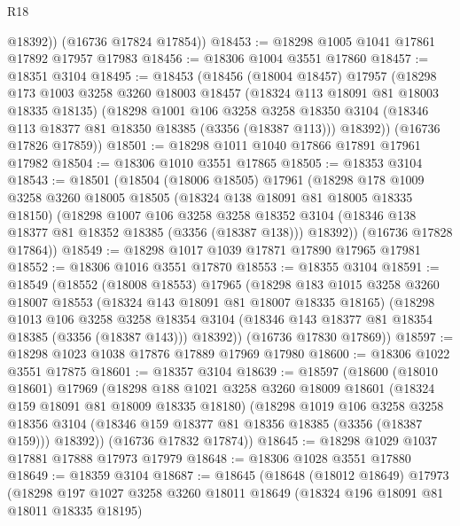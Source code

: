 \begin{lexlean}{R18}
\begin{coremodule}
          @18392))
      (@16736 @17824 @17854))
@18453 := @18298 @1005 @1041 @17861 @17892 @17957 @17983
@18456 := @18306 @1004 @3551 @17860
@18457 := @18351 @3104
@18495 := @18453
    (@18456
      (@18004 @18457)
      @17957
      (@18298
        @173
        @1003
        @3258
        @3260
        @18003
        @18457
        (@18324 @113 @18091 @81 @18003 @18335 @18135)
        (@18298
          @1001
          @106
          @3258
          @3258
          @18350
          @3104
          (@18346 @113 @18377 @81 @18350 @18385 (@3356 (@18387 @113)))
          @18392))
      (@16736 @17826 @17859))
@18501 := @18298 @1011 @1040 @17866 @17891 @17961 @17982
@18504 := @18306 @1010 @3551 @17865
@18505 := @18353 @3104
@18543 := @18501
    (@18504
      (@18006 @18505)
      @17961
      (@18298
        @178
        @1009
        @3258
        @3260
        @18005
        @18505
        (@18324 @138 @18091 @81 @18005 @18335 @18150)
        (@18298
          @1007
          @106
          @3258
          @3258
          @18352
          @3104
          (@18346 @138 @18377 @81 @18352 @18385 (@3356 (@18387 @138)))
          @18392))
      (@16736 @17828 @17864))
@18549 := @18298 @1017 @1039 @17871 @17890 @17965 @17981
@18552 := @18306 @1016 @3551 @17870
@18553 := @18355 @3104
@18591 := @18549
    (@18552
      (@18008 @18553)
      @17965
      (@18298
        @183
        @1015
        @3258
        @3260
        @18007
        @18553
        (@18324 @143 @18091 @81 @18007 @18335 @18165)
        (@18298
          @1013
          @106
          @3258
          @3258
          @18354
          @3104
          (@18346 @143 @18377 @81 @18354 @18385 (@3356 (@18387 @143)))
          @18392))
      (@16736 @17830 @17869))
@18597 := @18298 @1023 @1038 @17876 @17889 @17969 @17980
@18600 := @18306 @1022 @3551 @17875
@18601 := @18357 @3104
@18639 := @18597
    (@18600
      (@18010 @18601)
      @17969
      (@18298
        @188
        @1021
        @3258
        @3260
        @18009
        @18601
        (@18324 @159 @18091 @81 @18009 @18335 @18180)
        (@18298
          @1019
          @106
          @3258
          @3258
          @18356
          @3104
          (@18346 @159 @18377 @81 @18356 @18385 (@3356 (@18387 @159)))
          @18392))
      (@16736 @17832 @17874))
@18645 := @18298 @1029 @1037 @17881 @17888 @17973 @17979
@18648 := @18306 @1028 @3551 @17880
@18649 := @18359 @3104
@18687 := @18645
    (@18648
      (@18012 @18649)
      @17973
      (@18298
        @197
        @1027
        @3258
        @3260
        @18011
        @18649
        (@18324 @196 @18091 @81 @18011 @18335 @18195)

\end{coremodule}
\end{lexlean}
